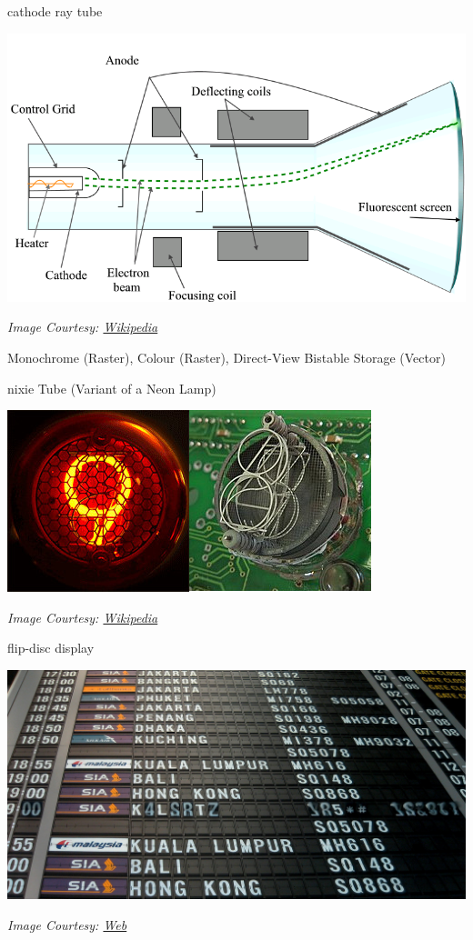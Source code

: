\documentclass[aspectratio=169,xcolor={dvipsnames,svgnames}]{beamer}
\begin{document}
\begin{frame}[label={sec:org1f1cbd4}]{cathode ray tube}
\centering

\begin{center}
\includegraphics[width=0.6\linewidth]{images/crt.png}
\end{center}
\tiny \emph{Image Courtesy: \href{https://en.wikipedia.org/wiki/File:Cathode\_ray\_Tube.PNG}{Wikipedia}}

Monochrome (Raster), Colour (Raster), Direct-View
Bistable Storage (Vector)
\end{frame}

\begin{frame}[label={sec:org65f9fb0}]{nixie Tube}
(Variant of a Neon Lamp)
\centering

\begin{center}
\includegraphics[width=0.6\linewidth]{images/Nixie2.jpg}
\end{center}
\tiny \emph{Image Courtesy: \href{https://en.wikipedia.org/wiki/Nixie\_tube}{Wikipedia}}
\end{frame}

\begin{frame}[label={sec:org54c236d}]{flip-disc display}
\centering

\begin{center}
\includegraphics[width=0.8\linewidth]{images/Changi-T2-Flipboard-2.jpg}
\end{center}
\tiny \emph{Image Courtesy: \href{https://mainlymiles.com/2020/01/17/changis-iconic-flip-board-displays-to-go-as-terminal-2-revamp-gets-underway/}{Web}}
\end{frame}
\end{document}
